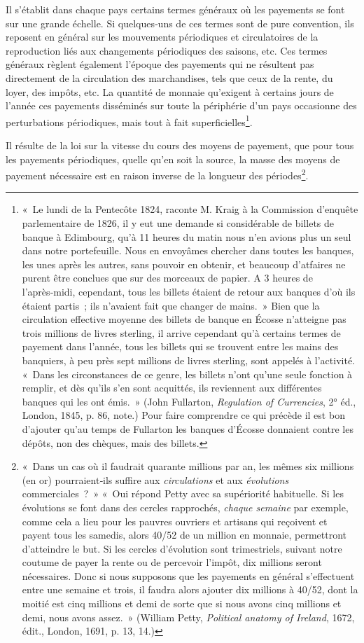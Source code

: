 \documentclass[french,twoside]{book} %
\begin{document}
Il s’établit dans chaque pays certains termes généraux où les payements se font sur une grande échelle. Si quelques‑uns de ces termes sont de pure convention, ils reposent en général sur les mouvements périodiques et circulatoires de la reproduction liés aux changements périodiques des saisons, etc. Ces termes généraux règlent également l’époque des payements qui ne résultent pas directement de la circulation des marchandises, tels que ceux de la rente, du loyer, des impôts, etc. La quantité de monnaie qu’exigent à certains jours de l’année ces payements disséminés sur toute la périphérie d’un pays occasionne des perturbations périodiques, mais tout à fait superficielles\footnote{« Le lundi de la Pentecôte 1824, raconte M. Kraig à la Commission d’enquête parlementaire de 1826, il y eut une demande si considérable de billets de banque à Edimbourg, qu’à 11 heures du matin nous n’en avions plus un seul dans notre portefeuille. Nous en envoyâmes chercher dans toutes les banques, les unes après les autres, sans pouvoir en obtenir, et beaucoup d’atfaires ne purent être conclues que sur des morceaux de papier. A 3 heures de l’après‑midi, cependant, tous les billets étaient de retour aux banques d’où ils étaient partis ; ils n’avaient fait que changer de mains. » Bien que la circulation effective moyenne des billets de banque en Écosse n’atteigne pas trois millions de livres sterling, il arrive cependant qu’à certains termes de payement dans l’année, tous les billets qui se trouvent entre les mains des banquiers, à peu près sept millions de livres sterling, sont appelés à l’activité. « Dans les circonstances de ce genre, les billets n’ont qu’une seule fonction à remplir, et dès qu’ils s’en sont acquittés, ils reviennent aux différentes banques qui les ont émis. » (John Fullarton, \emph{Regulation of Currencies}, 2° éd., London, 1845, p. 86, note.) Pour faire comprendre ce qui précède il est bon d’ajouter qu’au temps de Fullarton les banques d’Écosse donnaient contre les dépôts, non des chèques, mais des billets.}.\par
Il résulte de la loi sur la vitesse du cours des moyens de payement, que pour tous les payements périodiques, quelle qu’en soit la source, la masse des moyens de payement nécessaire est en raison inverse de la longueur des périodes\footnote{« Dans un cas où il faudrait quarante millions par an, les mêmes six millions (en or) pourraient‑ils suffire aux \emph{circulations} et aux \emph{évolutions} commerciales ? » « Oui répond Petty avec sa supériorité habituelle. Si les évolutions se font dans des cercles rapprochés, \emph{chaque semaine} par exemple, comme cela a lieu pour les pauvres ouvriers et artisans qui reçoivent et payent tous les samedis, alors 40/52 de un million en monnaie, permettront d’atteindre le but. Si les cercles d’évolution sont trimestriels, suivant notre coutume de payer la rente ou de percevoir l’impôt, dix millions seront nécessaires. Donc si nous supposons que les payements en général s’effectuent entre une semaine et trois, il faudra alors ajouter dix millions à 40/52, dont la moitié est cinq millions et demi de sorte que si nous avons cinq millions et demi, nous avons assez. » (William Petty, \emph{Political anatomy of Ireland}, 1672, édit., London, 1691, p. 13, 14.)}.\par
\end{document}
